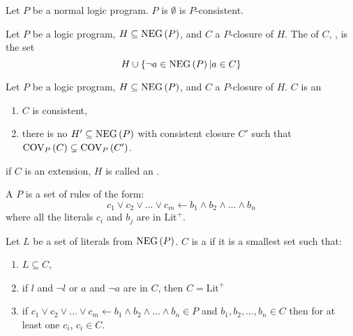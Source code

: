 \begin{defi}
Let $P$ be a normal logic program. $P$ is  \iffTx{} $\emptyset$ is $P$-consistent.
\cite{conf/ijcai/BrewkaK93}
\end{defi}

\begin{defi}
Let $P$ be a logic program, $H\subseteq\mbox{NEG}\left(P\right)$, and $C$ a $P$-closure of $H$. The  of $C$, , is the set
\begin{equation}
H\cup\left\{ \neg a\in\mbox{NEG}\left(P\right)|a\in C\right\}
\end{equation}
\cite{conf/ijcai/BrewkaK93}
\end{defi}

\begin{defi}
Let $P$ be a logic program, $H\subseteq\mbox{NEG}\left(P\right)$, and $C$ a $P$-closure of $H$. $C$ is an  \iffTx{}
\begin{enumerate}
 \item $C$ is consistent,
 \item there is no $H'\subseteq\mbox{NEG}\left(P\right)$ with consistent closure $C'$ such that $\mbox{COV}_P\left(C\right)\subsetneq\mbox{COV}_P\left(C'\right)$.
\end{enumerate}
if $C$ is an extension, $H$ is called an .
\cite{conf/ijcai/BrewkaK93}
\end{defi}

\begin{defi}
A  $P$ is a set of rules of the form:
\begin{equation}
c_1\vee c_2\vee\ldots\vee c_m\leftarrow b_1\wedge b_2\wedge\ldots\wedge b_n
\end{equation}
where all the literals $c_i$ and $b_j$ are in $\mbox{Lit}^+$.
\cite{conf/ijcai/BrewkaK93}
\end{defi}

\begin{defi}%
Let $L$ be a set of literals from $\mbox{NEG}\left(P\right)$. $C$ is a  if it is a smallest set such that:
\begin{enumerate}
 \item $L\subseteq C$,
 \item if $l$ and $\neg l$ or $a$ and $\neg a$ are in $C$, then $C=\mbox{Lit}^+$
 \item if $c_1\vee c_2\vee\ldots\vee c_m\leftarrow b_1\wedge b_2\wedge\ldots\wedge b_n\in P$ and $b_1,b_2,\ldots,b_n\in C$ then for at least one $c_i$, $c_i\in C$.
\end{enumerate}
\cite{conf/ijcai/BrewkaK93}
\end{defi}

